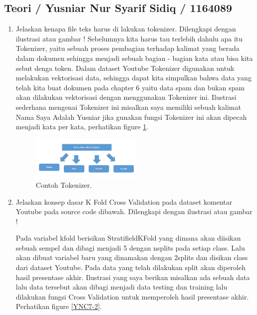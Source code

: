 \subsection{Teori / Yusniar Nur Syarif Sidiq / 1164089}
\begin{enumerate}

\item Jelaskan kenapa file teks harus di lakukan tokenizer. Dilengkapi dengan ilustrasi atau gambar !
	\subitem Sebelumnya kita harus tau terlebih dahulu apa itu Tokenizer, yaitu sebuah proses pembagian terhadap kalimat yang berada dalam dokumen sehingga menjadi sebuah bagian - bagian kata atau bisa kita sebut denga token. Dalam dataset Youtube Tokenizer digunakan untuk melakukan vektorisasi data, sehingga dapat kita simpulkan bahwa data yang telah kita buat dokumen pada chapter 6 yaitu data spam dan bukan spam akan dilakukan vektorisasi dengan menggunakan Tokenizer ini. Ilustrasi sederhana mengenai Tokenizer ini misalkan saya memiliki sebuah kalimat Nama Saya Adalah Yusniar jika gunakan fungsi Tokenizer ini akan dipecah menjadi kata per kata, perhatikan figure \ref{YNC7-1}.

	\begin{figure}[!htbp!]
		\centerline{\includegraphics[width=0.5\textwidth]{figures/YN/Chapter7/YNC7-1.png}}
		\caption{Contoh Tokenizer.}
		\label{YNC7-1}
	\end{figure}

\item Jelaskan konsep dasar K Fold Cross Validation pada dataset komentar Youtube pada source code dibawah. Dilengkapi dengan ilustrasi atau gambar !
	
	\subitem Pada variabel kfold berisikan StratifieldKFold yang dimana akan diisikan sebuah sempel dan dibagi menjadi 5 dengan nsplits pada setiap class. Lalu akan dibuat variabel baru yang dinamakan dengan 2splits dan disikan class dari dataset Youtube. Pada data yang telah dilakukan split akan diperoleh hasil presentase akhir. Ilustrasi yang saya berikan misalkan ada sebuah data lalu data tersebut akan dibagi menjadi data testing dan training lalu dilakukan fungsi Cross Validation untuk memperoleh hasil presentase akhir. Perhatikan figure \ref{YNC7-2}.


\end{enumerate}
